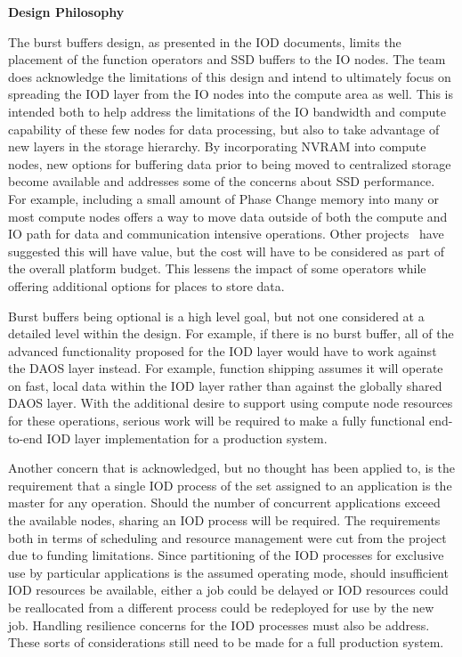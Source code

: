 \documentclass[conference]{IEEEtran}
\begin{document}
\noindent\textbf{Design Philosophy}

The burst buffers design, as presented in the IOD documents, limits the
placement of the function operators and SSD buffers to the IO nodes. The team
does acknowledge the limitations of this design and intend to ultimately focus
on spreading the IOD layer from the IO nodes into the compute area as well.
This is intended both to help address the limitations of the IO bandwidth and
compute capability of these few nodes for data processing, but also to take
advantage of new layers in the storage hierarchy. By incorporating NVRAM into
compute nodes, new options for buffering data prior to being moved to
centralized storage become available and addresses some of the concerns about
SSD performance. For example, including a small amount of Phase Change memory
into many or most compute nodes offers a way to move data outside of both the
compute and IO path for data and communication intensive operations. Other 
projects~\cite{zheng:2010:predata} have suggested this will have value, but the
cost will have to be considered as part of the overall platform budget. This
lessens the impact of some operators while offering additional options for
places to store data.

Burst buffers being optional is a high level goal, but not one considered at a
detailed level within the design. For example, if there is no burst buffer, all
of the advanced functionality proposed for the IOD layer would have to work
against the DAOS layer instead. For example, function shipping assumes it will
operate on fast, local data within the IOD layer rather than against the
globally shared DAOS layer. With the additional desire to support using compute
node resources for these operations, serious work will be required to make a
fully functional end-to-end IOD layer implementation for a production system.

Another concern that is acknowledged, but no thought has been applied to, is
the requirement that a single IOD process of the set assigned to an application
is the master for any operation.  Should the number of concurrent applications
exceed the available nodes, sharing an IOD process will be required. The
requirements both in terms of scheduling and resource management were cut from
the project due to funding limitations. Since partitioning of the IOD processes
for exclusive use by particular applications is the assumed operating mode,
should insufficient IOD resources be available, either a job could be delayed
or IOD resources could be reallocated from a different process could be
redeployed for use by the new job. Handling resilience concerns for the IOD
processes must also be address.  These sorts of considerations still need to be
made for a full production system.
\end{document}
